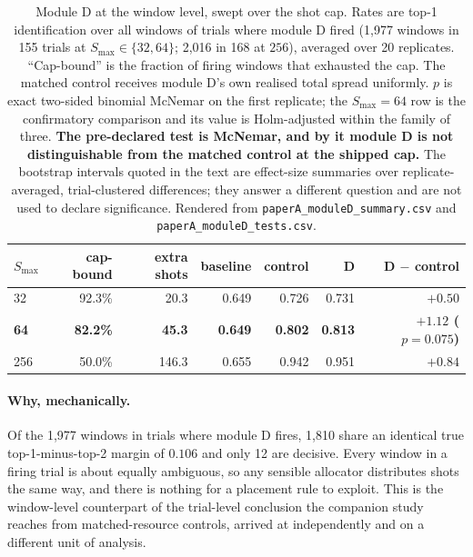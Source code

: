 \documentclass[final,5p,times,longtitle]{elsarticle}
\newenvironment{widetable}{\begin{table}[tbp]}{\end{table}}
\newenvironment{widetable}{\begin{table}[htbp]}{\end{table}}
\newcommand{\Smax}{S_{\max}}
\begin{document}
\begin{widetable}
\centering
\small
\caption{Module D at the window level, swept over the shot cap. Rates are
top-1 identification over all windows of trials where module D fired
(1{,}977 windows in 155 trials at $\Smax\in\{32,64\}$; 2{,}016 in 168 at
$256$), averaged over 20 replicates. ``Cap-bound'' is the fraction of
firing windows that exhausted the cap. The matched control receives module
D's own realised total spread uniformly. $p$ is exact two-sided binomial
McNemar on the first replicate; the $\Smax=64$ row is the confirmatory
comparison and its value is Holm-adjusted within the family of three.
\textbf{The pre-declared test is McNemar, and by it module D is not
distinguishable from the matched control at the shipped cap.} The
bootstrap intervals quoted in the text are effect-size summaries over
replicate-averaged, trial-clustered differences; they answer a different
question and are not used to declare significance.
Rendered from \texttt{paperA\_moduleD\_summary.csv} and
\texttt{paperA\_moduleD\_tests.csv}.}
\label{tab:dsweep}
\begin{tabular}{@{}lrrrrrr@{}}
\toprule
$\Smax$ & cap-bound & extra shots & baseline & control & D & D $-$ control \\
\midrule
32  & 92.3\% & 20.3  & 0.649 & 0.726 & 0.731 & $+0.50$ \\
\textbf{64}  & \textbf{82.2\%} & \textbf{45.3}  & \textbf{0.649} & \textbf{0.802} & \textbf{0.813} & \textbf{$+1.12$ ($p=0.075$)} \\
256 & 50.0\% & 146.3 & 0.655 & 0.942 & 0.951 & $+0.84$ \\
\bottomrule
\end{tabular}
\end{widetable}

\paragraph{Why, mechanically.} Of the 1{,}977 windows in trials where
module D fires, 1{,}810 share an identical true top-1-minus-top-2 margin of
$0.106$ and only 12 are decisive. Every window in a firing trial is about
equally ambiguous, so any sensible allocator distributes shots the same
way, and there is nothing for a placement rule to exploit. This is the
window-level counterpart of the trial-level conclusion the companion study
reaches from matched-resource controls, arrived at independently and on a
different unit of analysis.
\end{document}
